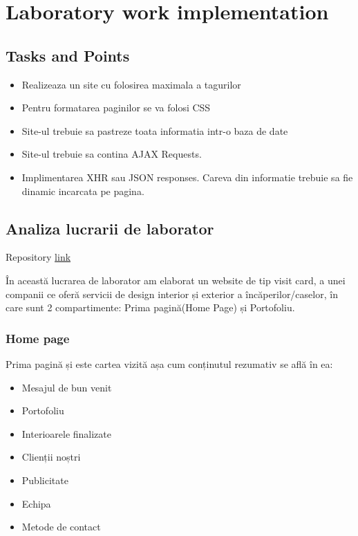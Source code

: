 \section{Laboratory work implementation}

\subsection{Tasks and Points}

\begin{itemize}
	\item Realizeaza un site cu folosirea maximala a tagurilor
	\item Pentru formatarea paginilor se va folosi CSS
	\item Site-ul trebuie sa pastreze toata informatia intr-o baza de date
	\item Site-ul trebuie sa contina AJAX Requests.
	\item Implimentarea XHR sau JSON responses. Careva din informatie trebuie sa fie dinamic incarcata pe pagina.
\end{itemize}

\subsection{Analiza lucrarii de laborator}
Repository \href{https://github.com/nadejda-danart/TI-141-F-R-MIDPS/tree/master/laborator3}{link}\par


În această lucrarea de laborator am elaborat un website de tip visit card, a unei companii ce oferă servicii de design interior și exterior a încăperilor/caselor, în care sunt 2 compartimente: Prima pagină(Home Page) și Portofoliu.

\subsubsection{Home page}

Prima pagină și este cartea vizită așa cum conținutul rezumativ se află în ea:

\begin{itemize}
	\item Mesajul de bun venit
	\item Portofoliu
	\item Interioarele finalizate
	\item Clienții noștri
	\item Publicitate
	\item Echipa
	\item Metode de contact
\end{itemize}

